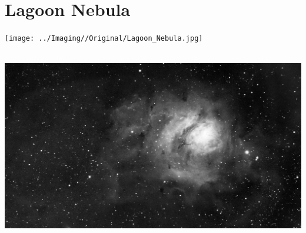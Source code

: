 \ \\\section{Lagoon Nebula}
\texttt{[image: ../Imaging//Original/Lagoon\_Nebula.jpg]}
{\footnotesize\color{white}


}\ \\
\includegraphics[width=\textwidth]{../Imaging//Grayscale/Lagoon_Nebula.jpg}
